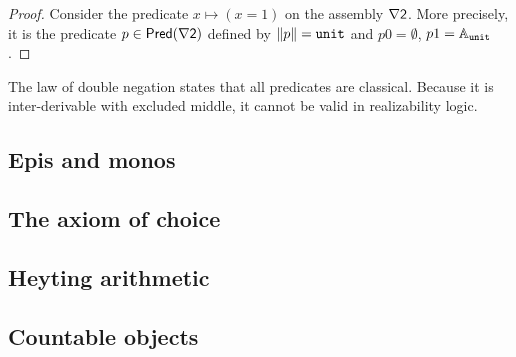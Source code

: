 \begin{proof}
  Consider the predicate $x \mapsto (x = 1)$ on the assembly $\nabla \mathsf{2}$.
  More precisely, it is the predicate $p \in \mathsf{Pred}(\nabla \mathsf{2})$ defined by
  $\|p\| = \mathtt{unit}$ and $p 0 = \emptyset$, $p 1 = \mathbb{A}_{\mathtt{unit}}$.
\end{proof}

The law of double negation states that all predicates are classical. Because it is inter-derivable with excluded middle, it cannot be valid in realizability logic.


\subsection{Epis and monos}
\label{sec:epis-monos}

\subsection{The axiom of choice}
\label{sec:axiom-choice}

\subsection{Heyting arithmetic}
\label{sec:heyting-arithmetic}

\subsection{Countable objects}
\label{sec:countable-objects}





